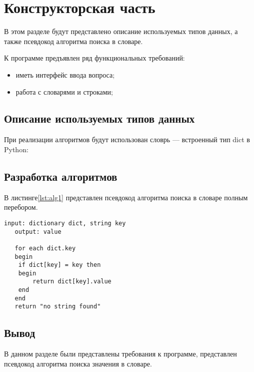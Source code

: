\chapter{Конструкторская часть}

В этом разделе будут представлено описание используемых типов данных, а также псевдокод алгоритма поиска в словаре.

К программе предъявлен ряд функциональных требований:
\begin{itemize}
	\item иметь интерфейс ввода вопроса;
	\item работа с словарями и строками;
\end{itemize}

\section{Описание используемых типов данных}
При реализации алгоритмов будут использован словрь --- встроенный тип dict в Python:
\section{Разработка алгоритмов}

В листинге\ref{lst:alg1} представлен псевдокод алгоритма поиска в словаре полным перебором.


\begin{lstlisting}[breakatwhitespace=false, label=lst:alg1, caption=Алгоритм поиска в словаре полным перебором]
	input: dictionary dict, string key
   output: value
   
   for each dict.key
   begin
	if dict[key] = key then
	begin
		return dict[key].value
	end
   end
   return "no string found"
   \end{lstlisting}

\section*{Вывод}

В данном разделе были представлены требования к программе, представлен псевдокод алгоритма поиска значения в словаре.

\clearpage